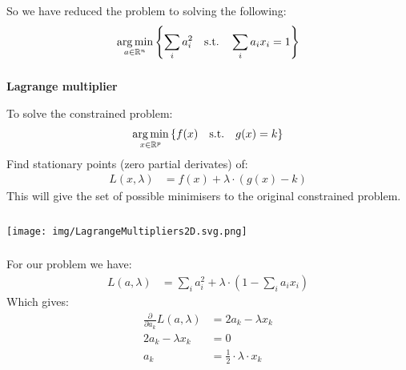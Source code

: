 \begin{frame}[fragile] \frametitle{}

So we have reduced the problem to solving the following:
\begin{align*}
\mathop{\mathrm{arg\,min}}_{a \in \mathbb{R}^n} \left\{ \sum_i a_i^2 \quad \text{s.t.} \quad \sum_i a_i x_i = 1 \right\}
\end{align*}

\end{frame}

\begin{frame}[fragile] \frametitle{}

{\bf Lagrange multiplier}

To solve the constrained problem:
\begin{align*}
\mathop{\mathrm{arg\,min}}_{x \in \mathbb{R}^p} \left\{ f(x) \quad \text{s.t.} \quad g(x) = k \right\}
\end{align*}
Find stationary points (zero partial derivates) of:
\begin{align*}
L(x,\lambda) &= f(x) + \lambda \cdot (g(x) - k)
\end{align*}
This will give the set of possible minimisers to the original constrained
problem.

\end{frame}

\begin{frame}[fragile] \frametitle{}

\begin{center}
\texttt{[image: img/LagrangeMultipliers2D.svg.png]}
\end{center}

\end{frame}

\begin{frame}[fragile] \frametitle{}

For our problem we have:
\begin{align*}
L(a,\lambda) &= \sum_i a_i^2 + \lambda \cdot \left( 1 - \sum_i a_i x_i\right)
\end{align*}
\pause  Which gives:
\begin{align*}
\frac{\partial}{\partial a_k}  L(a,\lambda) &= 2 a_k - \lambda x_k \\
2 a_k - \lambda x_k &= 0 \\
a_k &= \frac{1}{2} \cdot \lambda \cdot x_k
\end{align*}

\end{frame}


